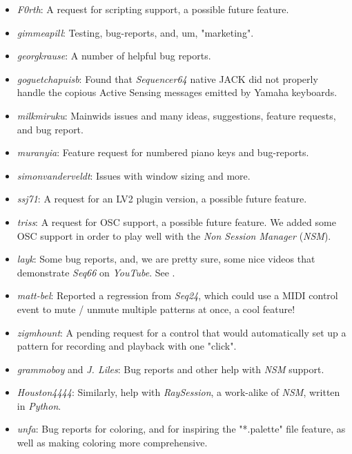    \begin{itemize}
      \item \textsl{F0rth}:
         A request for scripting support, a possible future feature.
      \item \textsl{gimmeapill}:
         Testing, bug-reports, and, um, "marketing".
      \item \textsl{georgkrause}:
         A number of helpful bug reports.
      \item \textsl{goguetchapuisb}:
         Found that \textsl{Sequencer64} native JACK did not properly handle
         the copious Active Sensing messages emitted by Yamaha keyboards.
      \item \textsl{milkmiruku}:
         Mainwids issues and many ideas, suggestions, feature requests, and bug
         report.
      \item \textsl{muranyia}:
         Feature request for numbered piano keys and bug-reports.
      \item \textsl{simonvanderveldt}:
         Issues with window sizing and more.
      \item \textsl{ssj71}:
         A request for an LV2 plugin version, a possible future feature.
      \item \textsl{triss}:
         A request for OSC support, a possible future feature.  We added some
         OSC support in order to play well with the \textsl{Non Session
         Manager} (\textsl{NSM}).
      \item \textsl{layk}:
         Some bug reports, and, we are pretty sure, some nice videos that
         demonstrate \textsl{Seq66} on \textsl{YouTube}.  See
         \cite{layk}.
      \item \textsl{matt-bel}:
         Reported a regression from \textsl{Seq24}, which could use
         a MIDI control event to mute / unmute multiple patterns at once,
         a cool feature!
      \item \textsl{zigmhount}:
         A pending request for a control that would automatically set up a
         pattern for recording and playback with one "click".
      \item \textsl{grammoboy} and \textsl{J. Liles}:
         Bug reports and other help with \textsl{NSM} support.
      \item \textsl{Houston4444}:
         Similarly, help with \textsl{RaySession}, a work-alike of
         \textsl{NSM}, written in \textsl{Python}.
      \item \textsl{unfa}:
         Bug reports for coloring, and for inspiring the "*.palette" file
         feature, as well as making coloring more comprehensive.
   \end{itemize}

